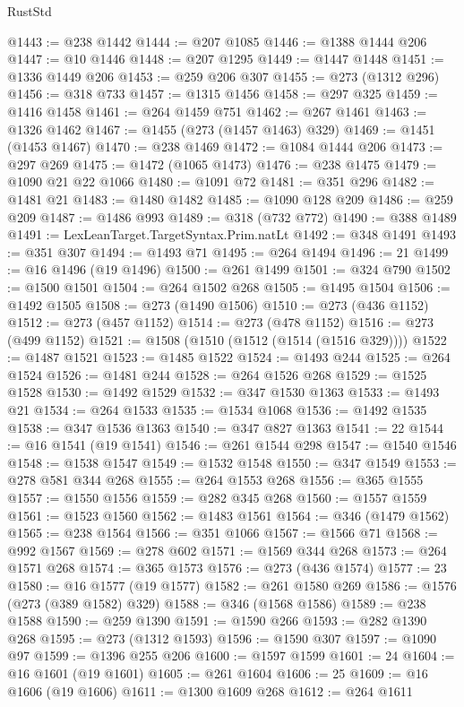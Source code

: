 \begin{lexlean}{RustStd}
\begin{coremodule}
{\begin{coremodule}
{{{{{{{{{{{{{{{{{{{{{{{{{{{{{{{{{{{{{{{{{{{{{{{{{{{{{{{{{{{{{{{{{{{{{{{{{{{{{{{{{{{{{@1443 := @238 @1442
@1444 := @207 @1085
@1446 := @1388 @1444 @206
@1447 := @10 @1446
@1448 := @207 @1295
@1449 := @1447 @1448
@1451 := @1336 @1449 @206
@1453 := @259 @206 @307
@1455 := @273 (@1312 @296)
@1456 := @318 @733
@1457 := @1315 @1456
@1458 := @297 @325
@1459 := @1416 @1458
@1461 := @264 @1459 @751
@1462 := @267 @1461
@1463 := @1326 @1462
@1467 := @1455 (@273 (@1457 @1463) @329)
@1469 := @1451 (@1453 @1467)
@1470 := @238 @1469
@1472 := @1084 @1444 @206
@1473 := @297 @269
@1475 := @1472 (@1065 @1473)
@1476 := @238 @1475
@1479 := @1090 @21 @22 @1066
@1480 := @1091 @72
@1481 := @351 @296
@1482 := @1481 @21
@1483 := @1480 @1482
@1485 := @1090 @128 @209
@1486 := @259 @209
@1487 := @1486 @993
@1489 := @318 (@732 @772)
@1490 := @388 @1489
@1491 := LexLeanTarget.TargetSyntax.Prim.natLt
@1492 := @348 @1491
@1493 := @351 @307
@1494 := @1493 @71
@1495 := @264 @1494
@1496 := 21
@1499 := @16 @1496 (@19 @1496)
@1500 := @261 @1499
@1501 := @324 @790
@1502 := @1500 @1501
@1504 := @264 @1502 @268
@1505 := @1495 @1504
@1506 := @1492 @1505
@1508 := @273 (@1490 @1506)
@1510 := @273 (@436 @1152)
@1512 := @273 (@457 @1152)
@1514 := @273 (@478 @1152)
@1516 := @273 (@499 @1152)
@1521 := @1508 (@1510 (@1512 (@1514 (@1516 @329))))
@1522 := @1487 @1521
@1523 := @1485 @1522
@1524 := @1493 @244
@1525 := @264 @1524
@1526 := @1481 @244
@1528 := @264 @1526 @268
@1529 := @1525 @1528
@1530 := @1492 @1529
@1532 := @347 @1530 @1363
@1533 := @1493 @21
@1534 := @264 @1533
@1535 := @1534 @1068
@1536 := @1492 @1535
@1538 := @347 @1536 @1363
@1540 := @347 @827 @1363
@1541 := 22
@1544 := @16 @1541 (@19 @1541)
@1546 := @261 @1544 @298
@1547 := @1540 @1546
@1548 := @1538 @1547
@1549 := @1532 @1548
@1550 := @347 @1549
@1553 := @278 @581 @344 @268
@1555 := @264 @1553 @268
@1556 := @365 @1555
@1557 := @1550 @1556
@1559 := @282 @345 @268
@1560 := @1557 @1559
@1561 := @1523 @1560
@1562 := @1483 @1561
@1564 := @346 (@1479 @1562)
@1565 := @238 @1564
@1566 := @351 @1066
@1567 := @1566 @71
@1568 := @992 @1567
@1569 := @278 @602
@1571 := @1569 @344 @268
@1573 := @264 @1571 @268
@1574 := @365 @1573
@1576 := @273 (@436 @1574)
@1577 := 23
@1580 := @16 @1577 (@19 @1577)
@1582 := @261 @1580 @269
@1586 := @1576 (@273 (@389 @1582) @329)
@1588 := @346 (@1568 @1586)
@1589 := @238 @1588
@1590 := @259 @1390
@1591 := @1590 @266
@1593 := @282 @1390 @268
@1595 := @273 (@1312 @1593)
@1596 := @1590 @307
@1597 := @1090 @97
@1599 := @1396 @255 @206
@1600 := @1597 @1599
@1601 := 24
@1604 := @16 @1601 (@19 @1601)
@1605 := @261 @1604
@1606 := 25
@1609 := @16 @1606 (@19 @1606)
@1611 := @1300 @1609 @268
@1612 := @264 @1611
}}}}}}}}}}}}}}}}}}}}}}}}}}}}}}}}}}}}}}}}}}}}}}}}}}}}}}}}}}}}}}}}}}}}}}}}}}}}}}}}}}}}}
\end{coremodule}}
\end{coremodule}
\end{lexlean}
